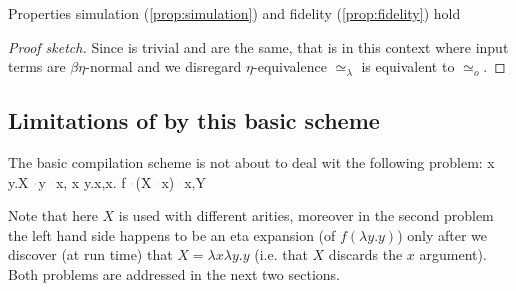\documentclass[sigconf,natbib=false,review]{acmart}
\newcommand{\appsep}{\ensuremath{\textcolor{lightgray}{\cdot}}}
\newcommand{\UnifRel}{\ensuremath{\simeq}}
\newcommand{\Uo}{\ensuremath{\UnifRel_o}\xspace}
\newcommand{\Ue}{\ensuremath{\UnifRel_\lambda}\xspace}
\begin{document}
\begin{lemma} Properties simulation (\ref{prop:simulation}) and
fidelity (\ref{prop:fidelity}) hold
\end{lemma}
\begin{proof}[Proof sketch]
Since  is trivial \fstep and \hstep are the same, that is
in this
context where input terms are $\beta\eta$-normal and we disregard $\eta$-equivalence
\Ue is equivalent to \Uo.
\end{proof}

\subsection{Limitations of by this basic scheme}
\label{sec:basic-comp-limitations}
The basic compilation scheme is not about to
deal wit the following problem:
\printAlll
  {{{\lambda x y.X \appsep y \appsep x, \lambda x y.x},{\lambda x. f \appsep (X \appsep x) \appsep x,Y}}}
  {{}}
  {{}}
  {{}}

\noindent Note that here $X$ is used with different arities, moreover
in the second problem the left hand side happens to be an
eta expansion (of $f (\lambda y.y)$) only after we discover (at run time)
that $X = \lambda x\lambda y.y$ (i.e. that $X$ discards the $x$ argument).
Both problems are addressed in the next two sections.
  




\end{document}
